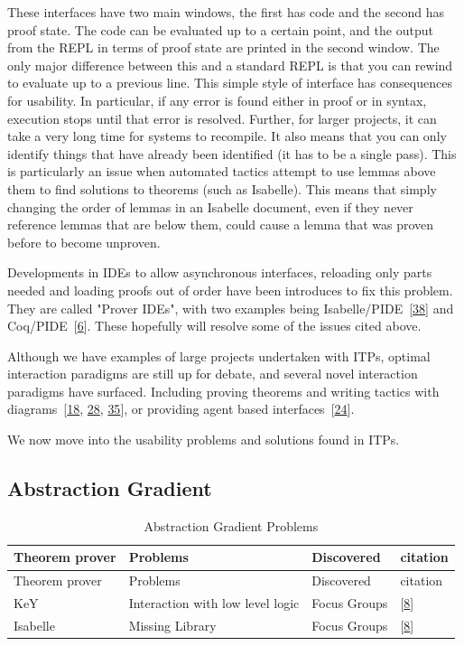\documentclass[
]{article}
\begin{document}
These interfaces have two main windows, the first has code and the
second has proof state. The code can be evaluated up to a certain point,
and the output from the REPL in terms of proof state are printed in the
second window. The only major difference between this and a standard
REPL is that you can rewind to evaluate up to a previous line. This
simple style of interface has consequences for usability. In particular,
if any error is found either in proof or in syntax, execution stops
until that error is resolved. Further, for larger projects, it can take
a very long time for systems to recompile. It also means that you can
only identify things that have already been identified (it has to be a
single pass). This is particularly an issue when automated tactics
attempt to use lemmas above them to find solutions to theorems (such as
Isabelle). This means that simply changing the order of lemmas in an
Isabelle document, even if they never reference lemmas that are below
them, could cause a lemma that was proven before to become unproven.

Developments in IDEs to allow asynchronous interfaces, reloading only
parts needed and loading proofs out of order have been introduces to fix
this problem. They are called "Prover IDEs", with two examples being
Isabelle/PIDE~{[}\protect\hyperlink{ref-wenzel_asynchronous_2014}{38}{]}
and Coq/PIDE~{[}\protect\hyperlink{ref-barras_asynchronous_2015}{6}{]}.
These hopefully will resolve some of the issues cited above.

Although we have examples of large projects undertaken with ITPs,
optimal interaction paradigms are still up for debate, and several novel
interaction paradigms have surfaced. Including proving theorems and
writing tactics with
diagrams~{[}\protect\hyperlink{ref-grov_tinker_2018}{18},
\protect\hyperlink{ref-lin_understanding_2016}{28},
\protect\hyperlink{ref-shams_accessible_2018}{35}{]}, or providing agent
based
interfaces~{[}\protect\hyperlink{ref-hunter_agent-based_2005}{24}{]}.

We now move into the usability problems and solutions found in ITPs.

\hypertarget{abstraction-gradient-1}{%
\subsection{Abstraction Gradient}\label{abstraction-gradient-1}}

\hypertarget{tbl:abstraction_gradient}{}
\begin{longtable}[]{@{}llll@{}}
\caption{\label{tbl:abstraction_gradient}Abstraction Gradient
Problems}\tabularnewline
\toprule
Theorem prover & Problems & Discovered & citation \\
\midrule
\endfirsthead
\toprule
Theorem prover & Problems & Discovered & citation \\
\midrule
\endhead
KeY & Interaction with low level logic & Focus Groups &
{[}\protect\hyperlink{ref-beckert_usability_2015}{8}{]} \\
Isabelle & Missing Library & Focus Groups &
{[}\protect\hyperlink{ref-beckert_usability_2015}{8}{]} \\
\bottomrule
\end{longtable}
\end{document}
